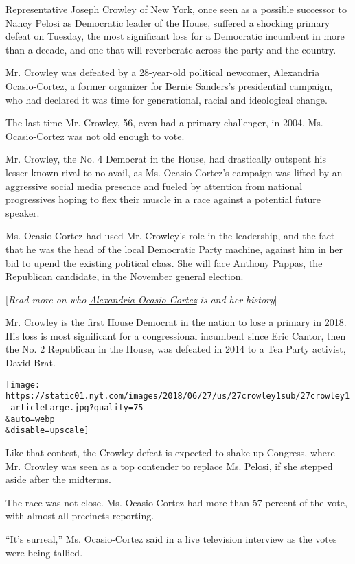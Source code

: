 Representative Joseph Crowley of New York, once seen as a possible
successor to Nancy Pelosi as Democratic leader of the House, suffered a
shocking primary defeat on Tuesday, the most significant loss for a
Democratic incumbent in more than a decade, and one that will
reverberate across the party and the country.

Mr. Crowley was defeated by a 28-year-old political newcomer, Alexandria
Ocasio-Cortez, a former organizer for Bernie Sanders's presidential
campaign, who had declared it was time for generational, racial and
ideological change.

The last time Mr. Crowley, 56, even had a primary challenger, in 2004,
Ms. Ocasio-Cortez was not old enough to vote.

Mr. Crowley, the No. 4 Democrat in the House, had drastically outspent
his lesser-known rival to no avail, as Ms. Ocasio-Cortez's campaign was
lifted by an aggressive social media presence and fueled by attention
from national progressives hoping to flex their muscle in a race against
a potential future speaker.

Ms. Ocasio-Cortez had used Mr. Crowley's role in the leadership, and the
fact that he was the head of the local Democratic Party machine, against
him in her bid to upend the existing political class. She will face
Anthony Pappas, the Republican candidate, in the November general
election.

{[}\emph{Read more on who}
\href{https://www.nytimes.com/2018/06/27/nyregion/alexandria-ocasio-cortez.html?action=click\&module=Intentional\&pgtype=Article}{\emph{Alexandria
Ocasio-Cortez}} \emph{is and her history}{]}

Mr. Crowley is the first House Democrat in the nation to lose a primary
in 2018. His loss is most significant for a congressional incumbent
since Eric Cantor, then the No. 2 Republican in the House, was defeated
in 2014 to a Tea Party activist, David Brat.

\texttt{[image: https://static01.nyt.com/images/2018/06/27/us/27crowley1sub/27crowley1-articleLarge.jpg?quality=75\\\&auto=webp\\\&disable=upscale]}

Like that contest, the Crowley defeat is expected to shake up Congress,
where Mr. Crowley was seen as a top contender to replace Ms. Pelosi, if
she stepped aside after the midterms.

The race was not close. Ms. Ocasio-Cortez had more than 57 percent of
the vote, with almost all precincts reporting.

``It's surreal,'' Ms. Ocasio-Cortez said in a live television interview
as the votes were being tallied.


